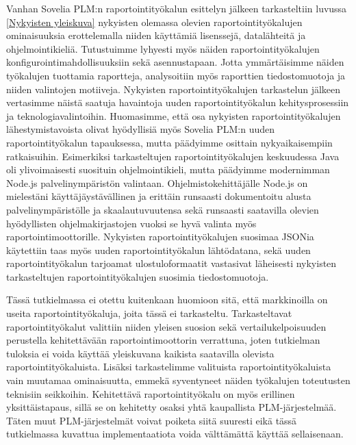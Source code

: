 Vanhan Sovelia PLM:n raportointityökalun esittelyn jälkeen tarkasteltiin luvussa \ref{Nykyisten yleiskuva} nykyisten olemassa olevien raportointityökalujen ominaisuuksia erottelemalla niiden käyttämiä lisenssejä, datalähteitä ja ohjelmointikieliä. Tutustuimme lyhyesti myös näiden raportointityökalujen konfigurointimahdollisuuksiin sekä asennustapaan. Jotta ymmärtäisimme näiden työkalujen tuottamia raportteja, analysoitiin myös raporttien tiedostomuotoja ja niiden valintojen motiiveja. Nykyisten raportointityökalujen tarkastelun jälkeen vertasimme näistä saatuja havaintoja uuden raportointityökalun kehitysprosessiin ja teknologiavalintoihin. Huomasimme, että osa nykyisten raportointityökalujen lähestymistavoista olivat hyödyllisiä myös Sovelia PLM:n uuden raportointityökalun tapauksessa, mutta päädyimme osittain nykyaikaisempiin ratkaisuihin. Esimerkiksi tarkasteltujen raportointityökalujen keskuudessa Java oli ylivoimaisesti suosituin ohjelmointikieli, mutta päädyimme modernimman Node.js palvelinympäristön valintaan. Ohjelmistokehittäjälle Node.js on mielestäni käyttäjäystävällinen ja erittäin runsaasti dokumentoitu alusta palvelinympäristölle ja skaalautuvuutensa sekä runsaasti saatavilla olevien hyödyllisten ohjelmakirjastojen vuoksi se hyvä valinta myös raportointimoottorille. Nykyisten raportointityökalujen suosimaa JSONia käytettiin taas myös uuden raportointityökalun lähtödatana, sekä uuden raportointityökalun tarjoamat ulostuloformaatit vastasivat läheisesti nykyisten tarkasteltujen raportointityökalujen suosimia tiedostomuotoja.

Tässä tutkielmassa ei otettu kuitenkaan huomioon sitä, että markkinoilla on useita raportointityökaluja, joita tässä ei tarkasteltu. Tarkasteltavat raportointityökalut valittiin niiden yleisen suosion sekä vertailukelpoisuuden perustella kehitettävään raportointimoottorin verrattuna, joten tutkielman tuloksia ei voida käyttää yleiskuvana kaikista saatavilla olevista raportointityökaluista. Lisäksi tarkastelimme valituista raportointityökaluista vain muutamaa ominaisuutta, emmekä syventyneet näiden työkalujen toteutusten teknisiin seikkoihin. Kehitettävä raportointityökalu on myös erillinen yksittäistapaus, sillä se on kehitetty osaksi yhtä kaupallista PLM-järjestelmää. Täten muut PLM-järjestelmät voivat poiketa siitä suuresti eikä tässä tutkielmassa kuvattua implementaatiota voida välttämättä käyttää sellaisenaan.

